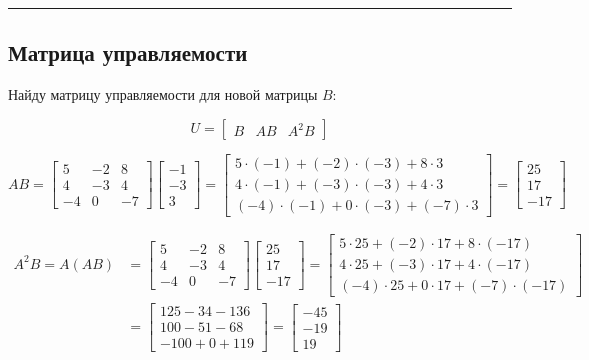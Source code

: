 \documentclass[a4paper,12pt]{article}
\begin{document}
	\hrule
	
	\newpage
	\subsection{Матрица управляемости}
	
	Найду матрицу управляемости для новой матрицы $B$:
	
	\[
	U = \begin{bmatrix} B & AB & A^2B \end{bmatrix}
	\]
	
	\[
	AB =
	\begin{bmatrix}
		5 & -2 & 8 \\
		4 & -3 & 4 \\
		-4 & 0 & -7
	\end{bmatrix}
	\begin{bmatrix}-1\\-3\\3\end{bmatrix}
	=
	\begin{bmatrix}
		5\cdot(-1) + (-2)\cdot(-3) + 8\cdot3 \\
		4\cdot(-1) + (-3)\cdot(-3) + 4\cdot3 \\
		(-4)\cdot(-1) + 0\cdot(-3) + (-7)\cdot3
	\end{bmatrix}
	=
	\begin{bmatrix} 25 \\ 17 \\ -17 \end{bmatrix}
	\]
	
	\begin{align*}
		A^2B = A(AB) &=
		\begin{bmatrix}
			5 & -2 & 8 \\
			4 & -3 & 4 \\
			-4 & 0 & -7
		\end{bmatrix}
		\begin{bmatrix}25\\17\\-17\end{bmatrix}
		=
		\begin{bmatrix}
			5\cdot25 + (-2)\cdot17 + 8\cdot(-17) \\
			4\cdot25 + (-3)\cdot17 + 4\cdot(-17) \\
			(-4)\cdot25 + 0\cdot17 + (-7)\cdot(-17)
		\end{bmatrix} \\[8pt]
		&=
		\begin{bmatrix}
			125 - 34 - 136 \\
			100 - 51 - 68 \\
			-100 + 0 + 119
		\end{bmatrix}
		=
		\begin{bmatrix} -45 \\ -19 \\ 19 \end{bmatrix}
	\end{align*}
	
\end{document}
